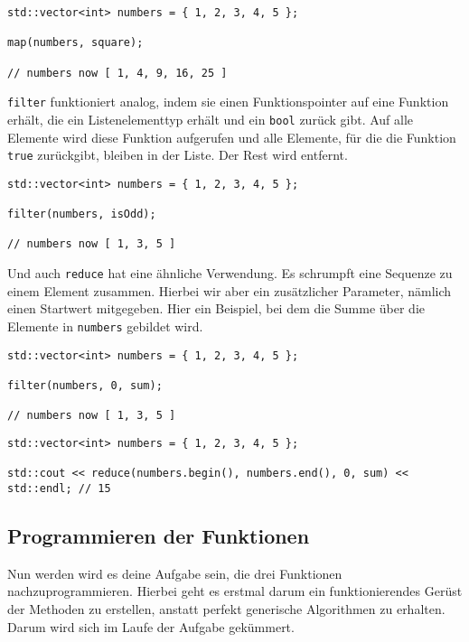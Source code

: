 \begin{lstlisting}
std::vector<int> numbers = { 1, 2, 3, 4, 5 };

map(numbers, square);

// numbers now [ 1, 4, 9, 16, 25 ]
\end{lstlisting}

\lstinline{filter} funktioniert analog, indem sie einen Funktionspointer auf eine Funktion erhält, die ein Listenelementtyp erhält und ein \lstinline{bool} zurück gibt.
Auf alle Elemente wird diese Funktion aufgerufen und alle Elemente, für die die Funktion \lstinline{true} zurückgibt, bleiben in der Liste. Der Rest wird entfernt. \\

\begin{lstlisting}
std::vector<int> numbers = { 1, 2, 3, 4, 5 };

filter(numbers, isOdd);

// numbers now [ 1, 3, 5 ]
\end{lstlisting}

Und auch \lstinline{reduce} hat eine ähnliche Verwendung.
Es schrumpft eine Sequenze zu einem Element zusammen.
Hierbei wir aber ein zusätzlicher Parameter, nämlich einen Startwert mitgegeben.
Hier ein Beispiel, bei dem die Summe über die Elemente in \lstinline{numbers} gebildet wird.

\begin{lstlisting}
std::vector<int> numbers = { 1, 2, 3, 4, 5 };

filter(numbers, 0, sum);

// numbers now [ 1, 3, 5 ]
\end{lstlisting}

\begin{lstlisting}
std::vector<int> numbers = { 1, 2, 3, 4, 5 };

std::cout << reduce(numbers.begin(), numbers.end(), 0, sum) << std::endl; // 15

    \end{lstlisting}

\subsection{Programmieren der Funktionen}

Nun werden wird es deine Aufgabe sein, die drei Funktionen nachzuprogrammieren.
Hierbei geht es erstmal darum ein funktionierendes Gerüst der Methoden zu erstellen, anstatt perfekt generische Algorithmen zu erhalten.
Darum wird sich im Laufe der Aufgabe gekümmert.

